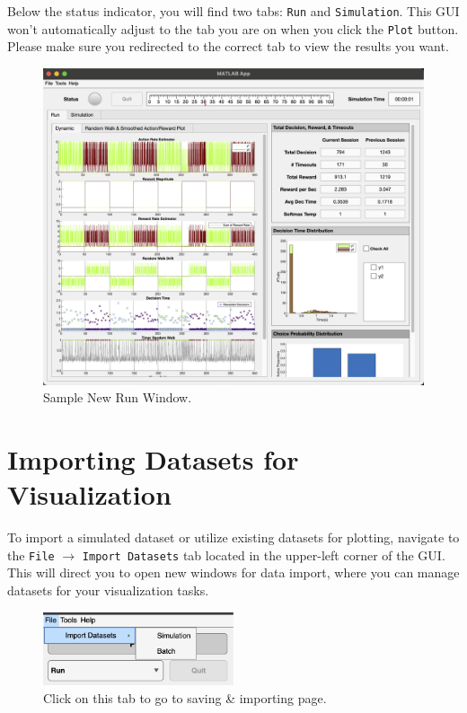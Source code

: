 Below the status indicator, you will find two tabs: \texttt{Run} and \texttt{Simulation}. This GUI won't automatically adjust to the tab you are on when you click the \texttt{Plot} button. Please make sure you redirected to the correct tab to view the results you want.

\begin{figure}[H]
    \centering
    \includegraphics[width=\textwidth]{figs/new_run_win.png}
    \caption{Sample New Run Window.}
    \label{fig:new_run_win}
\end{figure}

\section{Importing Datasets for Visualization}

To import a simulated dataset or utilize existing datasets for plotting, navigate to the \texttt{File} $\rightarrow$ \texttt{Import Datasets} tab located in the upper-left corner of the GUI. This will direct you to open new windows for data import, where you can manage datasets for your visualization tasks.

\begin{figure}[H]
    \centering
    \includegraphics[width=0.5\textwidth]{figs/import_data.png}
    \caption{Click on this tab to go to saving \& importing page.}
    \label{fig:saving_n_import_tab}
\end{figure}

